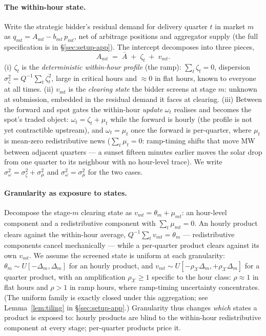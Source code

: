 \documentclass[11pt,a4paper]{article}
\theoremstyle{definition}
\theoremstyle{remark}
\theoremstyle{plain}
\begin{document}
\paragraph{The within-hour state.} Write the strategic bidder's residual demand for delivery quarter $t$ in market $m$ as $q_{mt} = A_{mt} - b_{mt}\, p_{mt}$, net of arbitrage positions and aggregator supply (the full \citeauthor{ito_reguant_2016} specification is in \S\ref{sec:setup-app}). The intercept decomposes into three pieces,
\[
A_{mt} \;=\; \bar A \;+\; \zeta_t \;+\; v_{mt}.
\]
(i) $\zeta_t$ is the \emph{deterministic within-hour profile} (the ramp): $\sum_t \zeta_t = 0$, dispersion $\sigma_\zeta^2 = Q^{-1}\sum_t \zeta_t^2$, large in critical hours and $\approx 0$ in flat hours, known to everyone at all times. (ii) $v_{mt}$ is the \emph{clearing state} the bidder screens at stage $m$: unknown at submission, embedded in the residual demand it faces at clearing. (iii) Between the forward and spot gates the within-hour \emph{update} $\omega_t$ realises and becomes the spot's traded object: $\omega_t = \zeta_t + \mu_t$ while the forward is hourly (the profile is not yet contractible upstream), and $\omega_t = \mu_t$ once the forward is per-quarter, where $\mu_t$ is mean-zero redistributive news ($\sum_t \mu_t = 0$: ramp-timing shifts that move MW between adjacent quarters --- a sunset fifteen minutes earlier moves the solar drop from one quarter to its neighbour with no hour-level trace). We write $\sigma_\omega^2 = \sigma_\zeta^2 + \sigma_\mu^2$ and $\sigma_\omega^2 = \sigma_\mu^2$ for the two cases.

\paragraph{Granularity as exposure to states.} Decompose the stage-$m$ clearing state as $v_{mt} = \theta_m + \mu_{mt}$: an hour-level component and a redistributive component with $\sum_t \mu_{mt} = 0$. An hourly product clears against the within-hour average, $Q^{-1}\sum_t v_{mt} = \theta_m$ --- redistributive components cancel mechanically --- while a per-quarter product clears against its own $v_{mt}$. We assume the screened state is uniform at each granularity: $\theta_m \sim U[-\Delta_m, \Delta_m]$ for an hourly product, and $v_{mt} \sim U[-\rho_{\mathcal X}\Delta_m, +\rho_{\mathcal X}\Delta_m]$ for a quarter product, with an amplification $\rho_{\mathcal X} \ge 1$ specific to the hour class: $\rho \approx 1$ in flat hours and $\rho > 1$ in ramp hours, where ramp-timing uncertainty concentrates. (The uniform family is exactly closed under this aggregation; see Lemma~\ref{lem:tiling} in \S\ref{sec:setup-app}.) Granularity thus changes \emph{which} states a product is exposed to: hourly products are blind to the within-hour redistributive component at every stage; per-quarter products price it.
\end{document}
